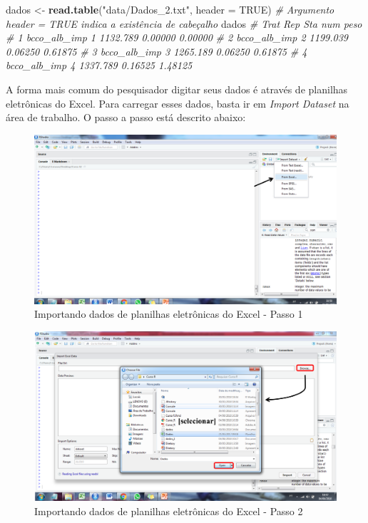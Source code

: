 \documentclass[
]{book}
\newenvironment{Shaded}{\begin{snugshade}}{\end{snugshade}}
\newcommand{\CommentTok}[1]{\textcolor[rgb]{0.56,0.35,0.01}{\textit{#1}}}
\newcommand{\DataTypeTok}[1]{\textcolor[rgb]{0.13,0.29,0.53}{#1}}
\newcommand{\KeywordTok}[1]{\textcolor[rgb]{0.13,0.29,0.53}{\textbf{#1}}}
\newcommand{\NormalTok}[1]{#1}
\newcommand{\OtherTok}[1]{\textcolor[rgb]{0.56,0.35,0.01}{#1}}
\newcommand{\StringTok}[1]{\textcolor[rgb]{0.31,0.60,0.02}{#1}}
\begin{document}
\begin{Shaded}
\begin{Highlighting}[]
\NormalTok{dados <-}\StringTok{ }\KeywordTok{read.table}\NormalTok{(}\StringTok{"data/Dados_2.txt"}\NormalTok{, }\DataTypeTok{header =} \OtherTok{TRUE}\NormalTok{)}
\CommentTok{# Argumento header = TRUE indica a existência de cabeçalho}
\NormalTok{dados}
\CommentTok{#           Trat Rep      Sta     num    peso}
\CommentTok{# 1 bcco_alb_imp   1 1132.789 0.00000 0.00000}
\CommentTok{# 2 bcco_alb_imp   2 1199.039 0.06250 0.61875}
\CommentTok{# 3 bcco_alb_imp   3 1265.189 0.06250 0.61875}
\CommentTok{# 4 bcco_alb_imp   4 1337.789 0.16525 1.48125}
\end{Highlighting}
\end{Shaded}

A forma mais comum do pesquisador digitar seus dados é através de planilhas eletrônicas do Excel. Para carregar esses dados, basta ir em \emph{Import Dataset} na área de trabalho. O passo a passo está descrito abaixo: 

\begin{figure}
\centering
\includegraphics{figures/Import.png}
\caption{Importando dados de planilhas eletrônicas do Excel - Passo 1}
\end{figure}

\begin{figure}
\centering
\includegraphics{figures/Import1.png}
\caption{Importando dados de planilhas eletrônicas do Excel - Passo 2}
\end{figure}
\end{document}
